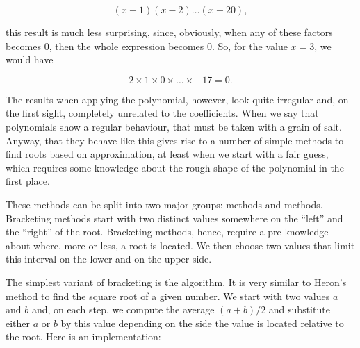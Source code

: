 \documentclass[tikz]{scrreprt}
\begin{document}
\[
(x-1)(x-2)\dots (x-20),
\]

this result is much less surprising, since, obviously,
when any of these factors becomes 0, then the whole
expression becomes 0. So, for the value $x=3$, we would have

\[
2 \times 1 \times 0 \times \dots \times -17 = 0.
\]

The results when applying the polynomial, however,
look quite irregular and, on the first sight,
completely unrelated to the coefficients.
When we say that polynomials show a regular behaviour,
that must be taken with a grain of salt.
Anyway, that they behave like this 
gives rise to a number of simple
methods to find roots based on approximation,
at least when we start with a fair guess,
which requires some knowledge about the rough shape
of the polynomial in the first place.

These methods can be split into two major groups:
 methods and  methods.
Bracketing methods start with two distinct values
somewhere on the ``left'' and the ``right'' of
the root. Bracketing methods, hence, require a
pre-knowledge about where, more or less, a root
is located. We then choose two values that limit
this interval on the lower and on the upper side.

The simplest variant of bracketing is the 
algorithm. It is very similar to Heron's method
to find the square root of a given number.
We start with two values $a$ and $b$ and, on each step,
we compute the average $(a+b)/2$ and substitute
either $a$ or $b$ by this value depending on the side
the value is located relative to the root.
Here is an implementation:
\end{document}
